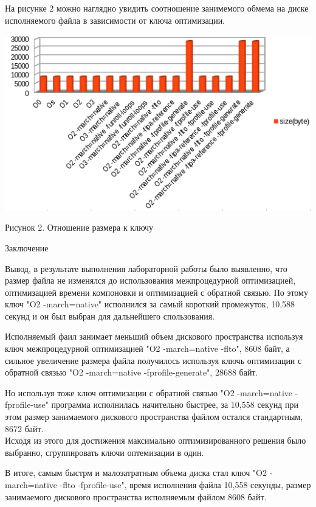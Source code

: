 \documentclass[12pt,a4paper]{scrartcl}
\begin{document}
На рисунке 2 можно наглядно увидить соотношение занимемого обмема на диске исполняемого файла в зависимости от 
ключа оптимизации.
\begin{center}
\includegraphics[width=\linewidth]{size.PNG}
\caption{Рисунок 2. Отношение размера к ключу}
\end{center}
\par
\newpage
\begin{center}
    {\LARGE Заключение}
\end{center}
\par
Вывод, в результате выполнения лабораторной работы было выявленно, 
что размер файла не изменялся до использования межпроцедурной
оптимизацией, оптимизацией времени компоновки и оптимизацией с обратной
связью. По этому ключ "O2 -march=native" исполнился за самый короткий промежуток, 10,588 секунд и он был выбран для дальнейшего спользования. \\
\par
Исполняемый фаил занимает меньший объем дискового пространства используя ключ межпроцедурной
оптимизацией "O2 -march=native -flto", 8608 байт, а сильное увеличение размера файла получилось используя ключь оптимизации с
обратной связью "O2 -march=native -fprofile-generate", 28688 байт. \\
\par
Но используя тоже ключ оптимизации с обратной связью "O2 -march=native -fprofile-use" программа исполнилась начительно быстрее, за 10,558 секунд при этом размер занимаемого дискового пространства файлом остался стандартным, 8672 байт.\\
Исходя из этого для достижения максимально оптимизированного решения было выбранно, сгруппировать ключи оптемизации в один.
\par
В итоге, самым быстрм и малозатратным объема диска стал ключ "O2 -march=native -flto -fprofile-use", время исполнения файла 10,558 секунды, размер занимаемого дискового пространства исполняемым файлом 8608 байт.
\end{document}
